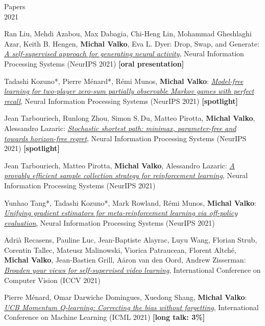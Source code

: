 \documentclass{resume}
\begin{document}
\begin{category}{Papers\\2021}





\citembullet
Ran Liu, Mehdi Azabou, Max Dabagia, Chi-Heng Lin, Mohammad Gheshlaghi Azar, Keith B. Hengen, {\bf Michal Valko}, Eva L. Dyer: Drop, Swap, and Generate:
\href{https://arxiv.org/pdf/2111.02338.pdf}{\emph{A self-supervised approach for generating neural activity}},
Neural Information Processing Systems
({\sf NeurIPS 2021}) {\bf [oral presentation]}

\citembullet
Tadashi Kozuno*, Pierre M\' enard*, R\' emi Munos, {\bf Michal Valko}: 
\href{https://arxiv.org/pdf/2106.06279.pdf}{\emph{Model-free learning for two-player zero-sum partially observable Markov games with perfect recall}},
Neural Information Processing Systems
({\sf NeurIPS 2021}) {\bf [spotlight]}


\citembullet
Jean Tarbouriech, Runlong Zhou, Simon S.\,Du, Matteo Pirotta, {\bf Michal Valko}, Alessandro Lazaric: 
\href{https://arxiv.org/pdf/2104.11186.pdf}{\emph{Stochastic shortest path: minimax, parameter-free and towards horizon-free regret}},
Neural Information Processing Systems
({\sf NeurIPS 2021})  {\bf [spotlight]}

\citembullet
Jean Tarbouriech, Matteo Pirotta, {\bf Michal Valko}, Alessandro Lazaric:
\href{http://arxiv.org/abs/2007.06437.pdf}
{\emph{A provably efficient sample collection strategy for reinforcement learning}},
Neural Information Processing Systems
({\sf NeurIPS 2021}) 



\citembullet
Yunhao Tang*, Tadashi Kozuno*, Mark Rowland, R\' emi Munos,  {\bf Michal Valko}: 
\href{https://arxiv.org/pdf/2106.13125.pdf}{\emph{Unifying gradient estimators for meta-reinforcement learning via off-policy evaluation}},
Neural Information Processing Systems
({\sf NeurIPS 2021}) 




\citembullet
Adri\`a Recasens, Pauline Luc, Jean-Baptiste Alayrac, Luyu Wang, Florian Strub, Corentin Tallec, Mateusz Malinowski, Viorica Patraucean, Florent Altch\' e, {\bf Michal Valko}, Jean-Bastien Grill, A\"aron van den Oord, Andrew Zisserman: 
\href{https://arxiv.org/pdf/2103.16559.pdf}{\emph{Broaden your views for self-supervised video learning}},
International Conference on Computer Vision
({\sf ICCV 2021}) 


\citembullet
Pierre M\' enard,  Omar Darwiche Domingues, Xuedong Shang,  {\bf Michal Valko}:
\href{https://arxiv.org/pdf/2103.01312.pdf}{\emph{UCB Momentum Q-learning: Correcting the bias without forgetting}},
International Conference on Machine Learning
({\sf ICML 2021})  {\bf [long talk: 3\%]}


\end{category}
\end{document}
